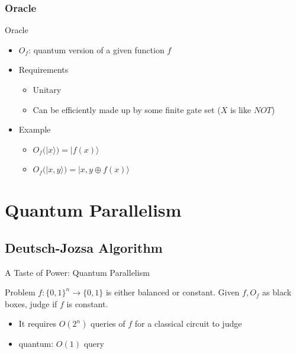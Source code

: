 \documentclass{beamer}
\newcommand{\<}{\langle}
\renewcommand{\>}{\rangle}
\begin{document}

\subsubsection{Oracle}

\begin{frame}{Oracle}

\begin{itemize}
    \item $O_f$: quantum version of a given function $f$
    \item Requirements
        \begin{itemize}
            \item Unitary
            \item Can be efficiently made up by some finite gate set ($X$ is like $NOT$)
        \end{itemize}
    \item Example
        \begin{itemize}
            \item \sout{$O_f(|x\>) = |f(x)\>$}
            \item $O_f(|x, y\>) = |x, y\oplus f(x)\>$
        \end{itemize}
\end{itemize}

\end{frame}


\section{Quantum Parallelism}

\subsection{Deutsch-Jozsa Algorithm}
\begin{frame}{A Taste of Power: Quantum Parallelism}

\begin{block}{Problem}
$f:\{0,1\}^n \to \{0,1\}$ is either balanced or constant.
Given $f, O_f$ as black boxes, judge if $f$ is constant.
\end{block}
\begin{itemize}
\item It requires $O(2^n)$ queries of $f$ for a classical circuit to judge
\item quantum: $O(1)$ query
\end{itemize}

\end{frame}
\end{document}
